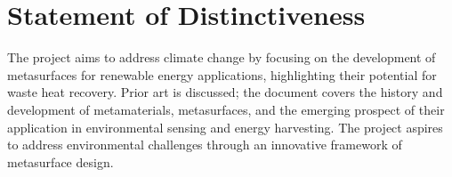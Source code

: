 \chapter*{Statement of Distinctiveness} 
 The project aims to address climate change by focusing on the development of metasurfaces for renewable energy applications, highlighting their potential for waste heat recovery. Prior art is discussed; the document covers the history and development of metamaterials, metasurfaces, and the emerging prospect of their application in environmental sensing and energy harvesting. The project aspires to address environmental challenges through an innovative framework of metasurface design.








